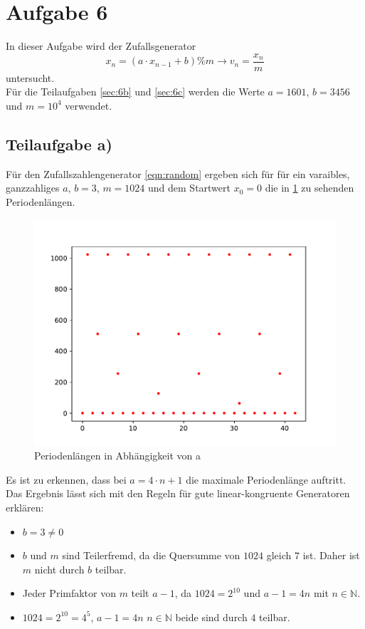 \section{Aufgabe 6}
In dieser Aufgabe wird der Zufallsgenerator
\begin{equation}
  x_n = (a \cdot x_{n-1} + b) \% m  \rightarrow v_n = \frac{x_n}{m}\label{eqn:randon}
\end{equation}
untersucht. \\
Für die Teilaufgaben \ref{sec:6b} und \ref{sec:6c} werden die Werte $a=1601$, $b=3456$ und $m=10^4$ verwendet.
\subsection{Teilaufgabe a)}
Für den Zufallszahlengenerator \eqref{eqn:random} ergeben sich für für ein varaibles, ganzzahliges $a$, $b=3$, $m=1024$
und dem Startwert $x_0=0$ die in \ref{fig:periodenlänge} zu sehenden Periodenlängen.

\begin{figure}[H]
  \includegraphics{Aufgabe06/Teilaufgabe_a).pdf}
  \caption{Periodenlängen in Abhängigkeit von a}
  \label{fig:periodenlänge}
\end{figure}

Es ist zu erkennen, dass bei $a=4 \cdot n + 1 $ die maximale Periodenlänge auftritt.
Das Ergebnis lässt sich mit den Regeln für gute linear-kongruente Generatoren erklären:
\begin{itemize}
  \item $b = 3 \neq 0$
  \item $b$ und $m$ sind Teilerfremd, da die Quersumme von $1024$ gleich $7$ ist. Daher ist $m$ nicht durch $b$ teilbar.
  \item Jeder Primfaktor von $m$ teilt $a-1$, da $1024=2^10$ und $a-1=4n$ mit $n \in \mathbb{N}$.
  \item $1024=2^10=4^5$, $a-1=4n$ $n \in \mathbb{N}$ \textrightarrow beide sind durch $4$ teilbar.
\end{itemize}

